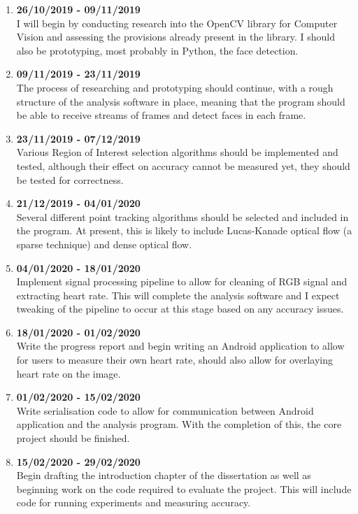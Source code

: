 \begin{enumerate}
\item \textbf{26/10/2019 - 09/11/2019} \\
I will begin by conducting research into the OpenCV library for Computer Vision and assessing the provisions already present in the library. I should also be prototyping, most probably in Python, the face detection.

\item \textbf{09/11/2019 - 23/11/2019} \\
The process of researching and prototyping should continue, with a rough structure of the analysis software in place, meaning that the program should be able to receive streams of frames and detect faces in each frame.

\item \textbf{23/11/2019 - 07/12/2019}\\
Various Region of Interest selection algorithms should be implemented and tested, although their effect on accuracy cannot be measured yet, they should be tested for correctness.

\item \textbf{21/12/2019 - 04/01/2020}\\
Several different point tracking algorithms should be selected and included in the program. At present, this is likely to include Lucas-Kanade optical flow (a sparse technique) and dense optical flow.

\item \textbf{04/01/2020 - 18/01/2020}\\
Implement signal processing pipeline to allow for cleaning of RGB signal and extracting heart rate. This will complete the analysis software and I expect tweaking of the pipeline to occur at this stage based on any accuracy issues.

\item \textbf{18/01/2020 - 01/02/2020}\\
Write the progress report and begin writing an Android application to allow for users to measure their own heart rate, should also allow for overlaying heart rate on the image.

\item \textbf{01/02/2020 - 15/02/2020}\\
Write serialisation code to allow for communication between Android application and the analysis program. With the completion of this, the core project should be finished.

\item \textbf{15/02/2020 - 29/02/2020}\\
Begin drafting the introduction chapter of the dissertation as well as beginning work on the code required to evaluate the project. This will include code for running experiments and measuring accuracy.


\end{enumerate}
